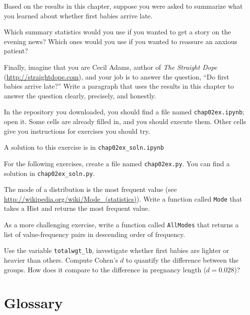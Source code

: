 \documentclass[12pt]{book}
\begin{document}
\begin{exercise}
Based on the results in this chapter, suppose you were asked to
summarize what you learned about whether first babies arrive late.

Which summary statistics would you use if you wanted to get a story
on the evening news?  Which ones would you use if you wanted to
reassure an anxious patient?

Finally, imagine that you are Cecil Adams, author of {\it The Straight
  Dope} (\url{http://straightdope.com}), and your job is to answer the
question, ``Do first babies arrive late?''  Write a paragraph that
uses the results in this chapter to answer the question clearly,
precisely, and honestly.

\end{exercise}

\begin{exercise}
In the repository you downloaded, you should find a file named
\verb"chap02ex.ipynb"; open it.  Some cells are already filled in, and
you should execute them.  Other cells give you instructions for
exercises you should try.

A solution to this exercise is in \verb"chap02ex_soln.ipynb"
\end{exercise}

For the following exercises, create a file named {\tt chap02ex.py}.
You can find a solution in \verb"chap02ex_soln.py".

\begin{exercise}
The mode of a distribution is the most frequent value (see
\url{http://wikipedia.org/wiki/Mode_(statistics)}).  Write a function
called {\tt Mode} that takes a Hist and returns the most
frequent value.

As a more challenging exercise, write a function called {\tt AllModes}
that returns a list of value-frequency pairs in descending order of
frequency.
\end{exercise}

\begin{exercise}
Use the variable \verb"totalwgt_lb", investigate whether first
babies are lighter or heavier than others.  Compute Cohen's $d$
to quantify the difference between the groups.  How does it
compare to the difference in pregnancy length ($d = 0.028$)?
\end{exercise}


\section{Glossary}
\end{document}
